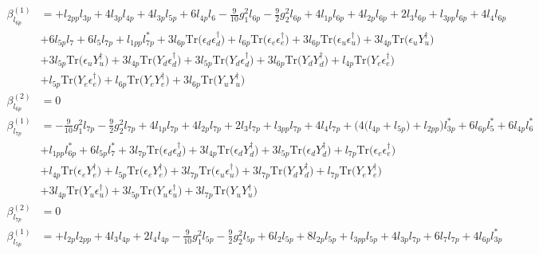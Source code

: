 {\begin{align}
\beta_{l_{6p}}^{(1)} & =  
+l_{2pp} l_{3p} +4 l_{3p} l_{4p} +4 l_{3p} l_{5p} +6 l_{4p} l_6 -\frac{9}{10} g_{1}^{2} l_{6p} -\frac{9}{2} g_{2}^{2} l_{6p} +4 l_{1p} l_{6p} +4 l_{2p} l_{6p} +2 l_3 l_{6p} +l_{3pp} l_{6p} +4 l_4 l_{6p} \nonumber \\ 
 &+6 l_{5p} l_7 +6 l_5 l_{7p} +l_{1pp} l_{7p}^* +3 l_{6p} \mbox{Tr}\Big({\epsilon_d  \epsilon_{d}^{\dagger}}\Big) +l_{6p} \mbox{Tr}\Big({\epsilon_e  \epsilon_{e}^{\dagger}}\Big) +3 l_{6p} \mbox{Tr}\Big({\epsilon_u  \epsilon_{u}^{\dagger}}\Big) +3 l_{4p} \mbox{Tr}\Big({\epsilon_u  Y_{u}^{\dagger}}\Big) \nonumber \\ 
 &+3 l_{5p} \mbox{Tr}\Big({\epsilon_u  Y_{u}^{\dagger}}\Big) +3 l_{4p} \mbox{Tr}\Big({Y_d  \epsilon_{d}^{\dagger}}\Big) +3 l_{5p} \mbox{Tr}\Big({Y_d  \epsilon_{d}^{\dagger}}\Big) +3 l_{6p} \mbox{Tr}\Big({Y_d  Y_{d}^{\dagger}}\Big) +l_{4p} \mbox{Tr}\Big({Y_e  \epsilon_{e}^{\dagger}}\Big) \nonumber \\ 
 &+l_{5p} \mbox{Tr}\Big({Y_e  \epsilon_{e}^{\dagger}}\Big) +l_{6p} \mbox{Tr}\Big({Y_e  Y_{e}^{\dagger}}\Big) +3 l_{6p} \mbox{Tr}\Big({Y_u  Y_{u}^{\dagger}}\Big) \\ 
\beta_{l_{6p}}^{(2)} & =  
0\\ 
\beta_{l_{7p}}^{(1)} & =  
-\frac{9}{10} g_{1}^{2} l_{7p} -\frac{9}{2} g_{2}^{2} l_{7p} +4 l_{1p} l_{7p} +4 l_{2p} l_{7p} +2 l_3 l_{7p} +l_{3pp} l_{7p} +4 l_4 l_{7p} +\Big(4 \Big(l_{4p} + l_{5p}\Big) + l_{2pp}\Big)l_{3p}^* +6 l_{6p} l_5^* +6 l_{4p} l_6^* \nonumber \\ 
 &+l_{1pp} l_{6p}^* +6 l_{5p} l_7^* +3 l_{7p} \mbox{Tr}\Big({\epsilon_d  \epsilon_{d}^{\dagger}}\Big) +3 l_{4p} \mbox{Tr}\Big({\epsilon_d  Y_{d}^{\dagger}}\Big) +3 l_{5p} \mbox{Tr}\Big({\epsilon_d  Y_{d}^{\dagger}}\Big) +l_{7p} \mbox{Tr}\Big({\epsilon_e  \epsilon_{e}^{\dagger}}\Big) \nonumber \\ 
 &+l_{4p} \mbox{Tr}\Big({\epsilon_e  Y_{e}^{\dagger}}\Big) +l_{5p} \mbox{Tr}\Big({\epsilon_e  Y_{e}^{\dagger}}\Big) +3 l_{7p} \mbox{Tr}\Big({\epsilon_u  \epsilon_{u}^{\dagger}}\Big) +3 l_{7p} \mbox{Tr}\Big({Y_d  Y_{d}^{\dagger}}\Big) +l_{7p} \mbox{Tr}\Big({Y_e  Y_{e}^{\dagger}}\Big) \nonumber \\ 
 &+3 l_{4p} \mbox{Tr}\Big({Y_u  \epsilon_{u}^{\dagger}}\Big) +3 l_{5p} \mbox{Tr}\Big({Y_u  \epsilon_{u}^{\dagger}}\Big) +3 l_{7p} \mbox{Tr}\Big({Y_u  Y_{u}^{\dagger}}\Big) \\ 
\beta_{l_{7p}}^{(2)} & =  
0\\ 
\beta_{l_{5p}}^{(1)} & =  
+l_{2p} l_{2pp} +4 l_3 l_{4p} +2 l_4 l_{4p} -\frac{9}{10} g_{1}^{2} l_{5p} -\frac{9}{2} g_{2}^{2} l_{5p} +6 l_2 l_{5p} +8 l_{2p} l_{5p} +l_{3pp} l_{5p} +4 l_{3p} l_{7p} +6 l_7 l_{7p} +4 l_{6p} l_{3p}^* \nonumber \\ 

\end{align}}
